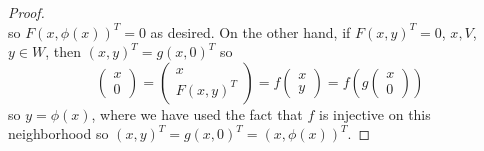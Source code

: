 \documentclass[12pt]{article}
\begin{document}
\begin{proof}
\begin{equation*}
	\end{equation*}
	so $F(x,\phi(x))^T=0$ as desired. On the other hand, if $F(x,y)^T=0$, $x,V$, $y\in W$, then $(x,y)^T=g(x,0)^T$ so 
	\begin{equation*}
		\begin{pmatrix}x\\ 0\end{pmatrix} = \begin{pmatrix}x\\ F(x,y)^T\end{pmatrix} = f\begin{pmatrix}x\\y\end{pmatrix}=f(g\begin{pmatrix}x\\ 0\end{pmatrix})
	\end{equation*}
	so $y=\phi(x)$, where we have used the fact that $f$ is injective on this neighborhood so $(x,y)^T=g(x,0)^T=(x,\phi(x))^T$. 


\end{proof}
\end{document}
